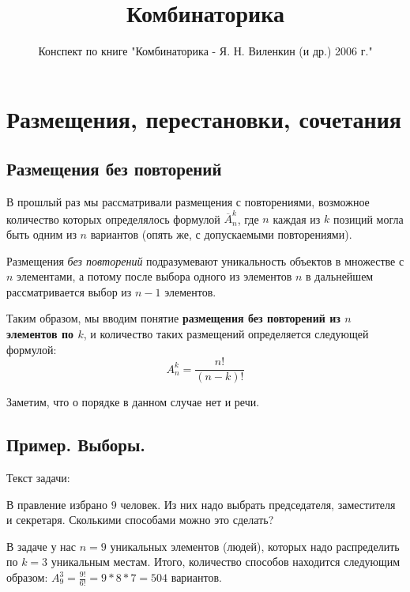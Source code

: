 \documentclass{article}
\title{Комбинаторика}
\author{Конспект по книге "Комбинаторика - Я. Н. Виленкин (и др.) 2006 г." }
\begin{document}
\maketitle
\tableofcontents

\section{Размещения, перестановки, сочетания}

\subsection{Размещения без повторений}

В прошлый раз мы рассматривали размещения с повторениями, возможное количество которых определялось формулой $\overline{A}_n^k$, где $n$ каждая из $k$ позиций могла быть одним из $n$ вариантов (опять же, с допускаемыми повторениями).

Размещения \textit{без повторений} подразумевают уникальность объектов в множестве с $n$ элементами, а потому после выбора одного из элементов $n$ в дальнейшем рассматривается выбор из $n-1$ элементов.

Таким образом, мы вводим понятие \textbf{размещения без повторений из $n$ элементов по $k$}, и количество таких размещений определяется следующей формулой:
$$A_n^k = \frac{n!}{(n-k)!}$$

Заметим, что о порядке в данном случае нет и речи.

\subsection{Пример. Выборы.}

Текст задачи:
\begin{displayquote}
В правление избрано $9$ человек. Из них надо выбрать председателя, заместителя и секретаря. Сколькими способами можно это сделать?
\end{displayquote}

В задаче у нас $n = 9$ уникальных элементов (людей), которых надо распределить по $k = 3$ уникальным местам. Итого, количество способов находится следующим образом: $A_9^3 = \frac{9!}{6!} = 9 * 8 * 7 = 504$ вариантов.
\end{document}
